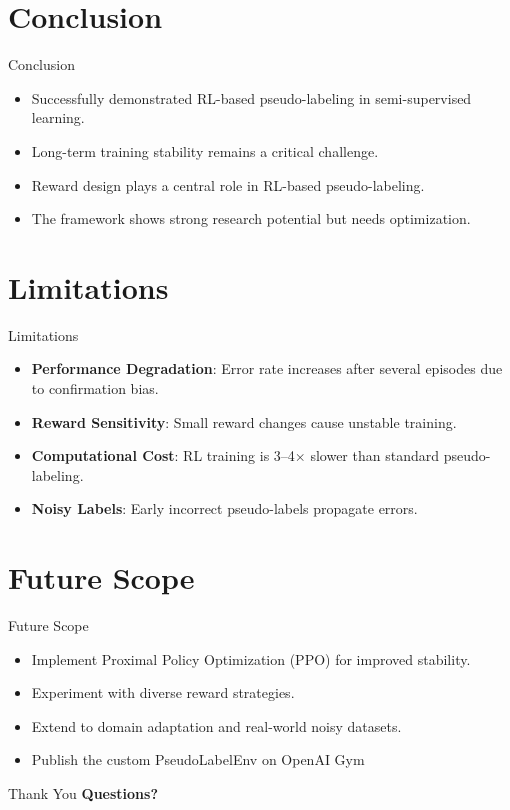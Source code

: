 \documentclass{beamer}
\begin{document}

\section{Conclusion}
\begin{frame}{Conclusion}
  \begin{itemize}
    \item Successfully demonstrated RL-based pseudo-labeling in semi-supervised learning.
    \item Long-term training stability remains a critical challenge.
    \item Reward design plays a central role in RL-based pseudo-labeling.
    \item The framework shows strong research potential but needs optimization.
  \end{itemize}
\end{frame}


\section{Limitations}
\begin{frame}{Limitations}
  \begin{itemize}
    \item \textbf{Performance Degradation}: Error rate increases after several episodes due to confirmation bias.
    \item \textbf{Reward Sensitivity}: Small reward changes cause unstable training.
    \item \textbf{Computational Cost}: RL training is 3--4$\times$ slower than standard pseudo-labeling.
    \item \textbf{Noisy Labels}: Early incorrect pseudo-labels propagate errors.
  \end{itemize}
\end{frame}


\section{Future Scope}
\begin{frame}{Future Scope}
  \begin{itemize}
    \item Implement Proximal Policy Optimization (PPO) for improved stability.
    \item Experiment with diverse reward strategies.
    \item Extend to domain adaptation and real-world noisy datasets.
    \item Publish the custom PseudoLabelEnv on OpenAI Gym
  \end{itemize}
\end{frame}


\begin{frame}{Thank You}
  \centering
  \textbf{Questions?}
\end{frame}

\end{document}
